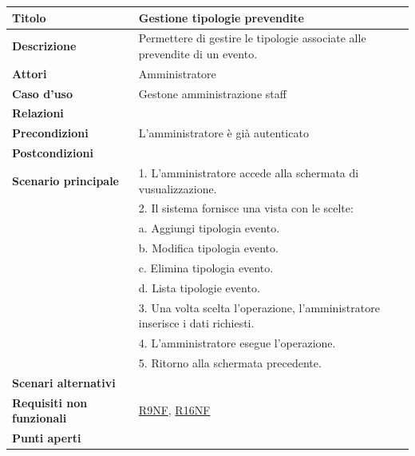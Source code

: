 \documentclass[a4paper]{article}
\begin{document}
\begin{center}
\begin{tabularx}{1\textwidth}{|l|X|}
    \hline
	\textbf{Titolo} & Gestione tipologie prevendite \\
	\hline
	\textbf{Descrizione} & Permettere di gestire le tipologie associate alle prevendite di un evento. \\
	\hline
	\textbf{Attori} & Amministratore \\
	\hline
	\textbf{Caso d'uso} & Gestone amministrazione staff \\
	\hline
	\textbf{Relazioni} &  \\
	\hline
	\textbf{Precondizioni} & L'amministratore è già autenticato  \\
	\hline
	\textbf{Postcondizioni} &  \\
	\hline
	\textbf{Scenario principale} & 1. L'amministratore accede alla schermata di vusualizzazione. \\
								 & 2. Il sistema fornisce una vista con le scelte: \\
								 & \quad a. Aggiungi tipologia evento.\\
								 & \quad b. Modifica tipologia evento.\\
								 & \quad c. Elimina tipologia evento.\\
								 & \quad d. Lista tipologie evento.\\
								 & 3. Una volta scelta l'operazione, l'amministratore inserisce i dati richiesti. \\
								 & 4. L'amministratore esegue l'operazione.\\
								 & 5. Ritorno alla schermata precedente.\\
	\hline
	\textbf{Scenari alternativi} & \\
	\hline
	\textbf{Requisiti non funzionali} & \hyperlink{R9NF}{R9NF}, \hyperlink{R16NF}{R16NF} \\
	\hline
	\textbf{Punti aperti} & \\
	\hline
\end{tabularx}
\end{center}

\end{document}
